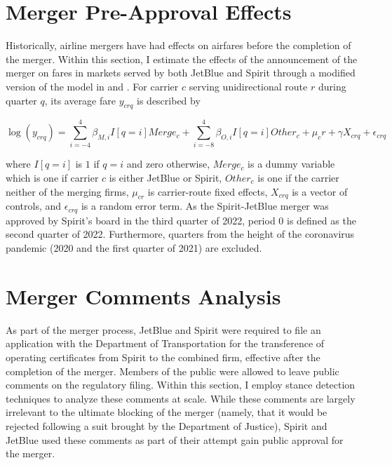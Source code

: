 \documentclass{article}
\begin{document}
\begin{appendices}
    \FloatBarrier
    \section{Merger Pre-Approval Effects}
    \setcounter{table}{0}
    \setcounter{figure}{0}

    Historically, airline mergers have had effects on airfares before the completion of the merger. Within this section, I estimate the effects of the announcement of the merger on fares in markets served by both JetBlue and Spirit through a modified version of the model in \citet{goolsbee_how_2008} and \citet{fan_when_2020}. For carrier $c$ serving unidirectional route $r$ during quarter $q$, its average fare $y_{crq}$ is described by 

    \[\log(y_{crq}) = \sum_{i = - 4}^{4} \beta_{M,i}I[q = i] Merge_{c} + \sum_{i = - 8}^{4} \beta_{O,i}I[q = i] Other_{c}  + \mu_cr + \gamma X_{crq}+ \epsilon_{crq}\]

    where $I[q = i]$ is $1$ if $q = i$ and zero otherwise, $Merge_{c}$ is a dummy variable which is one if carrier $c$ is either JetBlue or Spirit, $Other_c$ is one if the carrier neither of the merging firms, $\mu_{cr}$ is carrier-route fixed effects, $X_{crq}$ is a vector of controls, and $\epsilon_{crq}$ is a random error term. As the Spirit-JetBlue merger was approved by Spirit's board in the third quarter of 2022, period $0$ is defined as the second quarter of 2022. Furthermore, quarters from the height of the coronavirus pandemic (2020 and the first quarter of 2021) are excluded. 

    \FloatBarrier
	\section{Merger Comments Analysis}
    \label{sec:NaturalLanguage}

    \setcounter{table}{0}
    \setcounter{figure}{0}


As part of the merger process, JetBlue and Spirit were required to file an application with the Department of Transportation for the transference of operating certificates from Spirit to the combined firm, effective after the completion of the merger. Members of the public were allowed to leave public comments on the regulatory filing. Within this section, I employ stance detection techniques to analyze these comments at scale. While these comments are largely irrelevant to the ultimate blocking of the merger (namely, that it would be rejected following a suit brought by the Department of Justice), Spirit and JetBlue used these comments as part of their attempt gain public approval for the merger.


\end{appendices}
\end{document}
